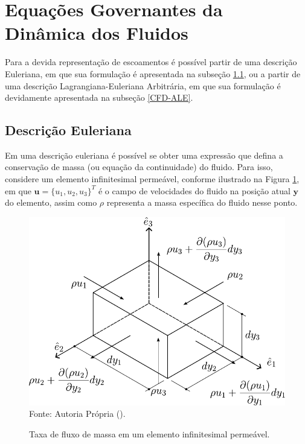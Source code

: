 \documentclass[_ArquivoPrincipal.tex]{subfiles}
\begin{document}
\section{Equações Governantes da Dinâmica dos Fluidos} \label{EGDF}

Para a devida representação de escoamentos é possível partir de uma descrição Euleriana, em que sua formulação é apresentada na subseção \ref{CFD-E}, ou a partir de uma descrição Lagrangiana-Euleriana Arbitrária, em que sua formulação é devidamente apresentada na subseção \ref{CFD-ALE}.

\subsection{Descrição Euleriana} \label{CFD-E}

Em uma descrição euleriana é possível se obter uma expressão que defina a conservação de massa (ou equação da continuidade) do fluido. Para isso, considere um elemento infinitesimal permeável, conforme ilustrado na Figura \ref{fig:BalMas}, em que $\mathbf{u}=\{u_1,u_2,u_3\}^T$ é o campo de velocidades do fluido na posição atual $\mathbf{y}$ do elemento, assim como $\rho$ representa a massa específica do fluido nesse ponto.

\begin{figure}[h]
    \centering
    \caption{Taxa de fluxo de massa em um elemento infinitesimal permeável.}
    \includegraphics[width=.5\linewidth]{Figuras/BalMas.pdf}
    \\Fonte: Autoria Própria (\the\year).
    \label{fig:BalMas}
\end{figure}
\end{document}
